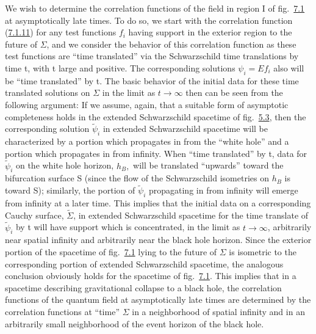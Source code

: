 \documentclass[11pt,a4paper]{article}
\begin{document}
We wish to determine the correlation functions of the field in region I of fig.~\hyperref[fig:7.1]{7.1} at asymptotically late times. To do so, we start with the correlation function (\hyperref[eq:7.1.11]{7.1.11}) for any test functions \(f_i\) having support in the exterior region to the future of \(\Sigma\), and we consider the behavior of this correlation function as these test functions are ``time translated'' via the Schwarzschild time translations by time t, with t large and positive. The corresponding solutions \(\psi_i = Ef_i\) also will be ``time translated'' by t. The basic behavior of the initial data for these time translated solutions on \(\Sigma\) in the limit as \(t\to\infty\) then can be seen from the following argument: If we assume, again, that a suitable form of asymptotic completeness holds in the extended Schwarzschild spacetime of fig.~\hyperref[fig:5.3]{5.3}, then the corresponding solution \(\tilde{\psi}_i\) in extended Schwarzschild spacetime will be characterized by a portion which propagates in from the ``white hole'' and a portion which propagates in from infinity. When ``time translated'' by t, data for \(\widetilde{\psi}_i\) on the white hole horizon, \(h_B,\) will be translated ``upwards'' toward the bifurcation surface S (since the flow of the Schwarzschild isometries on \(h_B\) is toward S); similarly, the portion of \(\widetilde{\psi}_i\) propagating in from infinity will emerge from infinity at a later time. This implies that the initial data on a corresponding Cauchy surface, \(\tilde{\Sigma}\), in extended Schwarzschild spacetime for the time translate of \(\widetilde{\psi}_i\) by t will have support which is concentrated, in the limit as \(t \rightarrow \infty\), arbitrarily near spatial infinity and arbitrarily near the black hole horizon. Since the exterior portion of the spacetime of fig.~\hyperref[fig:7.1]{7.1} lying to the future of \(\Sigma\) is isometric to the corresponding portion of extended Schwarzschild spacetime, the analogous conclusion obviously holds for the spacetime of fig.~\hyperref[fig:7.1]{7.1}. This implies that in a spacetime describing gravitational collapse to a black hole, the correlation functions of the quantum field at asymptotically late times are determined by the correlation functions at ``time'' \(\Sigma\) in a neighborhood of spatial infinity and in an arbitrarily small neighborhood of the event horizon of the black hole.
\end{document}
